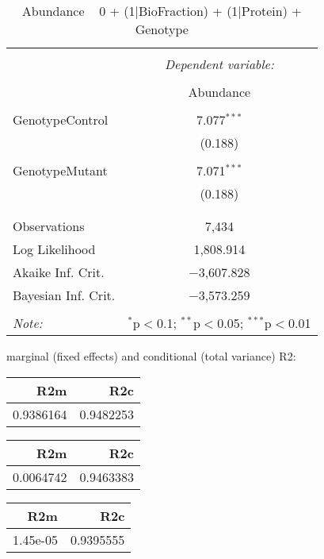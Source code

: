 \documentclass[11pt]{report}
\begin{document}
\begin{table}[!htbp] \centering 
  \caption{Abundance ~ 0 + (1|BioFraction) + (1|Protein) + Genotype} 
  \label{} 
\begin{tabular}{@{\extracolsep{5pt}}lc} 
\\[-1.8ex]\hline 
\hline \\[-1.8ex] 
 & \multicolumn{1}{c}{\textit{Dependent variable:}} \\ 
\cline{2-2} 
\\[-1.8ex] & Abundance \\ 
\hline \\[-1.8ex] 
 GenotypeControl & 7.077$^{***}$ \\ 
  & (0.188) \\ 
  & \\ 
 GenotypeMutant & 7.071$^{***}$ \\ 
  & (0.188) \\ 
  & \\ 
\hline \\[-1.8ex] 
Observations & 7,434 \\ 
Log Likelihood & 1,808.914 \\ 
Akaike Inf. Crit. & $-$3,607.828 \\ 
Bayesian Inf. Crit. & $-$3,573.259 \\ 
\hline 
\hline \\[-1.8ex] 
\textit{Note:}  & \multicolumn{1}{r}{$^{*}$p$<$0.1; $^{**}$p$<$0.05; $^{***}$p$<$0.01} \\ 
\end{tabular} 
\end{table} 
marginal (fixed effects) and conditional (total variance) R2:

\begin{tabular}{r|r}
\hline
R2m & R2c\\
\hline
0.9386164 & 0.9482253\\
\hline
\end{tabular}

\begin{tabular}{r|r}
\hline
R2m & R2c\\
\hline
0.0064742 & 0.9463383\\
\hline
\end{tabular}

\begin{tabular}{r|r}
\hline
R2m & R2c\\
\hline
1.45e-05 & 0.9395555\\
\hline
\end{tabular}
\end{document}
